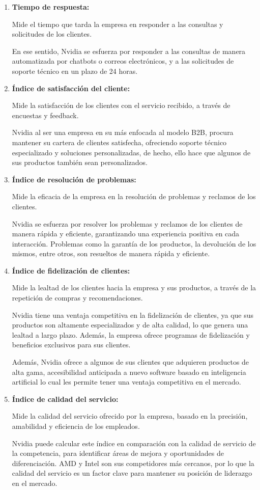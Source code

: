\documentclass{article}
\begin{document}
\begin{enumerate}
  \item \textbf{Tiempo de respuesta:}
  
  Mide el tiempo que tarda la empresa en responder a las consultas y solicitudes de los clientes.
  
  En ese sentido, Nvidia se esfuerza por responder a las consultas de manera automatizada por chatbots o correos electrónicos, y a las solicitudes de soporte técnico en un plazo de 24 horas.

  \item \textbf{Índice de satisfacción del cliente:}
  
  Mide la satisfacción de los clientes con el servicio recibido, a través de encuestas y feedback.
  
  Nvidia al ser una empresa en su más enfocada al modelo B2B, procura mantener su cartera de clientes satisfecha, ofreciendo soporte técnico especializado y soluciones personalizadas, de hecho, ello hace que algunos de sus productos también sean personalizados.

  \item \textbf{Índice de resolución de problemas:}
  
  Mide la eficacia de la empresa en la resolución de problemas y reclamos de los clientes.
  
  Nvidia se esfuerza por resolver los problemas y reclamos de los clientes de manera rápida y eficiente, garantizando una experiencia positiva en cada interacción. Problemas como la garantía de los productos, la devolución de los mismos, entre otros, son resueltos de manera rápida y eficiente.

  \item \textbf{Índice de fidelización de clientes:} 
  
  Mide la lealtad de los clientes hacia la empresa y sus productos, a través de la repetición de compras y recomendaciones.

  Nvidia tiene una ventaja competitiva en la fidelización de clientes, ya que sus productos son altamente especializados y de alta calidad, lo que genera una lealtad a largo plazo. Además, la empresa ofrece programas de fidelización y beneficios exclusivos para sus clientes.

  Además, Nvidia ofrece a algunos de sus clientes que adquieren productos de alta gama, accesibilidad anticipada a nuevo software basado en inteligencia artificial lo cual les permite tener una ventaja competitiva en el mercado.

  \item \textbf{Índice de calidad del servicio:}
  
  Mide la calidad del servicio ofrecido por la empresa, basado en la precisión, amabilidad y eficiencia de los empleados.

  Nvidia puede calcular este índice en comparación con la calidad de servicio de la competencia, para identificar áreas de mejora y oportunidades de diferenciación. AMD y Intel son sus competidores más cercanos, por lo que la calidad del servicio es un factor clave para mantener su posición de liderazgo en el mercado.

\end{enumerate} 
  
\end{document}
